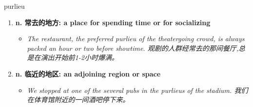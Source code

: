 
\begin{frame}
{\huge purlieu}
\begin{center}
\begin{enumerate}\Large
  \item \textbf{n. 常去的地方: a place for spending time or for socializing}
  \begin{itemize}
    \item \em{\Large{The restaurant, the preferred purlieu of the theatergoing crowd, is always packed an hour or two before showtime. 观剧的人群经常去的那间餐厅,总是在演出开始前1-2小时爆满。}}
  \end{itemize}
  \item \textbf{n. 临近的地区: an adjoining region or space}
  \begin{itemize}
    \item \em{\Large{We stopped at one of the several pubs in the purlieus of the stadium. 我们在体育馆附近的一间酒吧停下来。}}
  \end{itemize}
\end{enumerate}
\end{center}
\end{frame}
